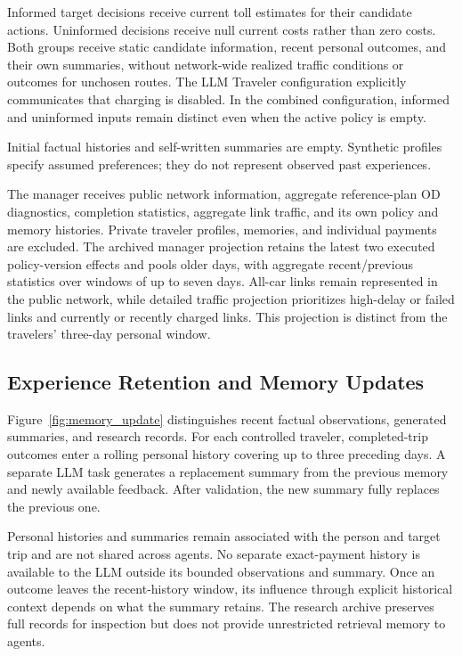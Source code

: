 Informed target decisions receive current toll estimates
for their candidate actions. Uninformed decisions receive
null current costs rather than zero costs. Both groups
receive static candidate information, recent personal
outcomes, and their own summaries, without network-wide
realized traffic conditions or outcomes for unchosen routes.
The LLM Traveler configuration explicitly communicates
that charging is disabled. In the combined configuration,
informed and uninformed inputs remain distinct even when
the active policy is empty.

Initial factual histories and self-written summaries are
empty. Synthetic profiles specify assumed preferences;
they do not represent observed past experiences.

The manager receives public network information, aggregate
reference-plan OD diagnostics, completion statistics,
aggregate link traffic, and its own policy and memory
histories. Private traveler profiles, memories, and
individual payments are excluded. The archived manager
projection retains the latest two executed policy-version
effects and pools older days, with aggregate recent/previous
statistics over windows of up to seven days. All-car links
remain represented in the public network, while detailed
traffic projection prioritizes high-delay or failed links
and currently or recently charged links. This projection
is distinct from the travelers' three-day personal window.

\subsection{Experience Retention and Memory Updates}
\label{app:memory-updates}

Figure~\ref{fig:memory_update} distinguishes recent factual
observations, generated summaries, and research records.
For each controlled traveler, completed-trip outcomes enter
a rolling personal history covering up to three preceding
days. A separate LLM task generates a replacement summary
from the previous memory and newly available feedback.
After validation, the new summary fully replaces the
previous one.

Personal histories and summaries remain associated with
the person and target trip and are not shared across agents.
No separate exact-payment history is available to the LLM
outside its bounded observations and summary. Once an
outcome leaves the recent-history window, its influence
through explicit historical context depends on what the
summary retains. The research archive preserves full
records for inspection but does not provide unrestricted
retrieval memory to agents.

